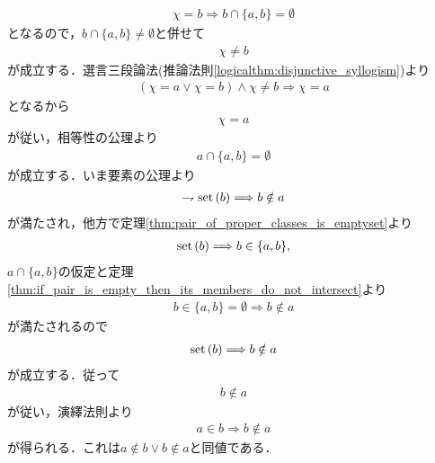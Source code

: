 \begin{prf}
\begin{description}
\begin{align}
					\chi = b \Longrightarrow b \cap \{a,b\} = \emptyset
				\end{align}
				となるので，$b \cap \{a,b\} \neq \emptyset$と併せて
				\begin{align}
					\chi \neq b
				\end{align}
				が成立する．選言三段論法(推論法則\ref{logicalthm:disjunctive_syllogism})より
				\begin{align}
					(\chi = a \vee \chi = b) \wedge \chi \neq b \Longrightarrow \chi = a
				\end{align}
				となるから
				\begin{align}
					\chi = a
				\end{align}
				が従い，相等性の公理より
				\begin{align}
					a \cap \{a,b\} = \emptyset
				\end{align}
				が成立する．いま要素の公理より
				\begin{align}
					\rightharpoondown \operatorname*{set} \left(b\right) \Longrightarrow b \notin a
				\end{align}
				が満たされ，他方で定理\ref{thm:pair_of_proper_classes_is_emptyset}より
				\begin{align}
					\operatorname*{set} \left(b\right) \Longrightarrow b \in \{a,b\},
				\end{align}
				$a \cap \{a,b\}$の仮定と定理\ref{thm:if_pair_is_empty_then_its_members_do_not_intersect}より
				\begin{align}
					b \in \{a,b\} = \emptyset \Longrightarrow b \notin a
				\end{align}
				が満たされるので
				\begin{align}
					\operatorname*{set} \left(b\right) \Longrightarrow b \notin a
				\end{align}
				が成立する．従って
				\begin{align}
					b \notin a
				\end{align}
				が従い，演繹法則より
				\begin{align}
					a \in b \Longrightarrow b \notin a
				\end{align}
				が得られる．これは$a \notin b \vee b \notin a$と同値である．
				

\end{description}
\end{prf}

